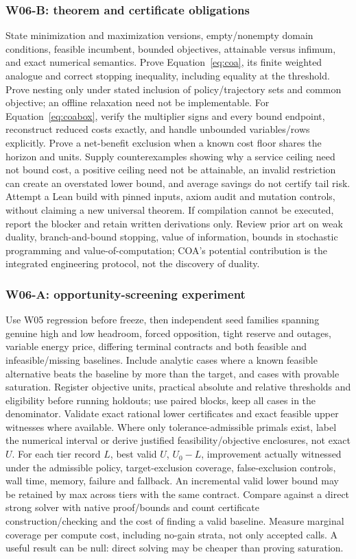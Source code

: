 \documentclass[11pt,letterpaper]{article}
\begin{document}
\subsubsection{W06-B: theorem and certificate obligations}
State minimization and maximization versions, empty/nonempty domain conditions, feasible incumbent, bounded objectives, attainable versus infimum, and exact numerical semantics. Prove Equation~\ref{eq:coa}, its finite weighted analogue and correct stopping inequality, including equality at the threshold. Prove nesting only under stated inclusion of policy/trajectory sets and common objective; an offline relaxation need not be implementable. For Equation~\ref{eq:coabox}, verify the multiplier signs and every bound endpoint, reconstruct reduced costs exactly, and handle unbounded variables/rows explicitly. Prove a net-benefit exclusion when a known cost floor shares the horizon and units. Supply counterexamples showing why a service ceiling need not bound cost, a positive ceiling need not be attainable, an invalid restriction can create an overstated lower bound, and average savings do not certify tail risk. Attempt a Lean build with pinned inputs, axiom audit and mutation controls, without claiming a new universal theorem. If compilation cannot be executed, report the blocker and retain written derivations only. Review prior art on weak duality, branch-and-bound stopping, value of information, bounds in stochastic programming and value-of-computation; COA's potential contribution is the integrated engineering protocol, not the discovery of duality.

\subsubsection{W06-A: opportunity-screening experiment}
Use W05 regression before freeze, then independent seed families spanning genuine high and low headroom, forced opposition, tight reserve and outages, variable energy price, differing terminal contracts and both feasible and infeasible/missing baselines. Include analytic cases where a known feasible alternative beats the baseline by more than the target, and cases with provable saturation. Register objective units, practical absolute and relative thresholds and eligibility before running holdouts; use paired blocks, keep all cases in the denominator. Validate exact rational lower certificates and exact feasible upper witnesses where available. Where only tolerance-admissible primals exist, label the numerical interval or derive justified feasibility/objective enclosures, not exact $U$. For each tier record $L$, best valid $U$, $U_0-L$, improvement actually witnessed under the admissible policy, target-exclusion coverage, false-exclusion controls, wall time, memory, failure and fallback. An incremental valid lower bound may be retained by max across tiers with the same contract. Compare against a direct strong solver with native proof/bounds and count certificate construction/checking and the cost of finding a valid baseline. Measure marginal coverage per compute cost, including no-gain strata, not only accepted calls. A useful result can be null: direct solving may be cheaper than proving saturation.
\end{document}
